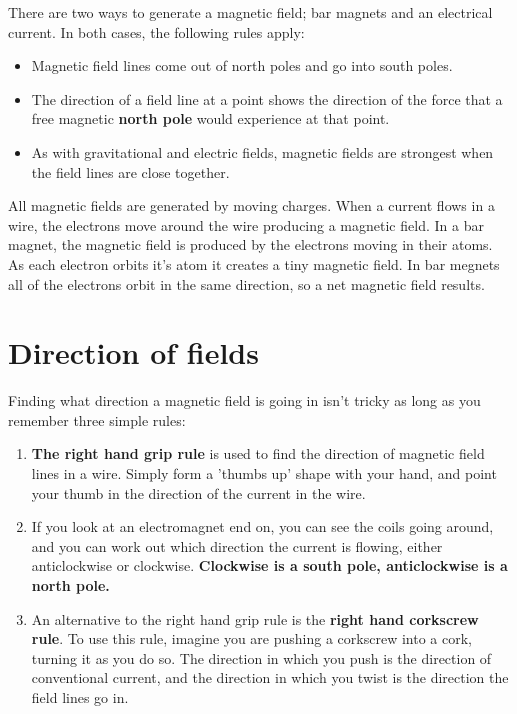 \documentclass{article}
\begin{document}
There are two ways to generate a magnetic field; bar magnets and an electrical
current. In both cases, the following rules apply:

\begin{itemize}

	\item Magnetic field lines come out of north poles and go into south poles.

    \item The direction of a field line at a point shows the direction of the
	force that a free magnetic {\bf north pole} would experience at that point.

	\item As with gravitational and electric fields, magnetic fields are
	strongest when the field lines are close together.

\end{itemize}

All magnetic fields are generated by moving charges. When a current flows in a
wire, the electrons move around the wire producing a magnetic field. In a bar
magnet, the magnetic field is produced by the electrons moving in their atoms.
As each electron orbits it's atom it creates a tiny magnetic field. In bar
megnets all of the electrons orbit in the same direction, so a net magnetic
field results.

\section*{Direction of fields}

Finding what direction a magnetic field is going in isn't tricky as long as you
remember three simple rules:

\begin{enumerate}

    \item {\bf The right hand grip rule} is used to find the direction of
	magnetic field lines in a wire. Simply form a 'thumbs up' shape with your
	hand, and point your thumb in the direction of the current in the wire.

	\item If you look at an electromagnet end on, you can see the coils going
	around, and you can work out which direction the current is flowing, either
	anticlockwise or clockwise. {\bf Clockwise is a south pole, anticlockwise
	is a north pole.}

	\item An alternative to the right hand grip rule is the {\bf right hand
	corkscrew rule}. To use this rule, imagine you are pushing a corkscrew into
	a cork, turning it as you do so. The direction in which you push is the
	direction of conventional current, and the direction in which you twist is
	the direction the field lines go in.

\end{enumerate}
\end{document}
